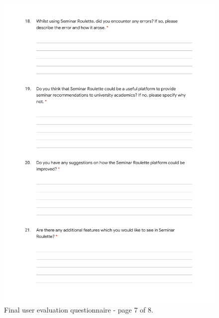 \documentclass{l4proj}
\begin{document}
\begin{appendices}
\begin{figure}[htb]
    \centering
    \includegraphics[width=\linewidth]{images/final_evaluation_7.pdf}    
    \caption{Final user evaluation questionnaire - page 7 of 8.}
    \label{fig:final_evaluation_7} 
\end{figure}


\end{appendices}
\end{document}
